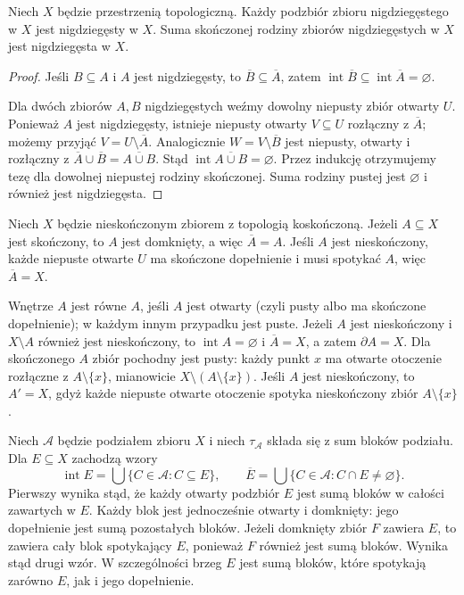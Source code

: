 \begin{stwierdzenie}
\label{prop:topog-nigdziegesty-sumy}
Niech $X$ będzie przestrzenią topologiczną.
Każdy podzbiór zbioru nigdziegęstego w $X$
jest nigdziegęsty w $X$.
Suma skończonej rodziny zbiorów nigdziegęstych
w $X$ jest nigdziegęsta w $X$.
\end{stwierdzenie}
\begin{proof}
Jeśli $B\subseteq A$ i $A$ jest nigdziegęsty,
to $\overline B\subseteq\overline A$,
zatem $\operatorname{int}\overline B
\subseteq\operatorname{int}\overline A=\varnothing$.

Dla dwóch zbiorów $A,B$ nigdziegęstych
weźmy dowolny niepusty zbiór otwarty $U$.
Ponieważ $A$ jest nigdziegęsty, istnieje niepusty
otwarty $V\subseteq U$ rozłączny z $\overline A$;
możemy przyjąć $V=U\setminus\overline A$.
Analogicznie $W=V\setminus\overline B$ jest
niepusty, otwarty i rozłączny z
$\overline A\cup\overline B=\overline{A\cup B}$.
Stąd $\operatorname{int}\overline{A\cup B}=\varnothing$.
Przez indukcję otrzymujemy tezę dla dowolnej
niepustej rodziny skończonej. Suma rodziny pustej
jest $\varnothing$ i również jest nigdziegęsta.
\end{proof}

\begin{przyklad}
\label{ex:topog-operacje-koskonczona}
Niech $X$ będzie nieskończonym zbiorem z topologią
koskończoną. Jeżeli $A\subseteq X$ jest skończony,
to $A$ jest domknięty, a więc $\overline A=A$.
Jeśli $A$ jest nieskończony, każde niepuste otwarte
$U$ ma skończone dopełnienie i musi spotykać $A$,
więc $\overline A=X$.

Wnętrze $A$ jest równe $A$, jeśli $A$ jest otwarty
(czyli pusty albo ma skończone dopełnienie);
w każdym innym przypadku jest puste.
Jeżeli $A$ jest nieskończony i $X\setminus A$
również jest nieskończony, to
$\operatorname{int}A=\varnothing$ i $\overline A=X$,
a zatem $\partial A=X$.
Dla skończonego $A$ zbiór pochodny jest pusty:
każdy punkt $x$ ma otwarte otoczenie rozłączne
z $A\setminus\{x\}$, mianowicie
$X\setminus(A\setminus\{x\})$.
Jeśli $A$ jest nieskończony, to $A'=X$,
gdyż każde niepuste otwarte otoczenie spotyka
nieskończony zbiór $A\setminus\{x\}$.
\end{przyklad}

\begin{przyklad}
\label{ex:topog-operacje-podzial}
Niech $\mathcal A$ będzie podziałem zbioru $X$
i niech $\tau_{\mathcal A}$ składa się z sum bloków
podziału. Dla $E\subseteq X$ zachodzą wzory
\[
\operatorname{int}E
 =\bigcup\{C\in\mathcal A:C\subseteq E\},\qquad
\overline E
 =\bigcup\{C\in\mathcal A:C\cap E\ne\varnothing\}.
\]
Pierwszy wynika stąd, że każdy otwarty podzbiór $E$
jest sumą bloków w całości zawartych w $E$.
Każdy blok jest jednocześnie otwarty i domknięty:
jego dopełnienie jest sumą pozostałych bloków.
Jeżeli domknięty zbiór $F$ zawiera $E$,
to zawiera cały blok spotykający $E$,
ponieważ $F$ również jest sumą bloków.
Wynika stąd drugi wzór. W szczególności
brzeg $E$ jest sumą bloków, które spotykają
zarówno $E$, jak i jego dopełnienie.
\end{przyklad}

